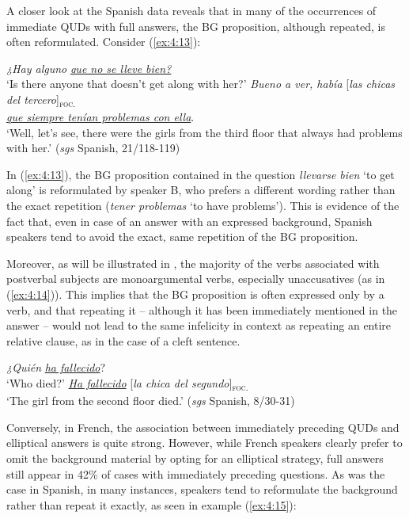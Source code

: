 A closer look at the Spanish data reveals that in many of the occurrences of immediate QUDs with full answers, the BG proposition, although repeated, is often reformulated. Consider (\ref{ex:4:13}):

\ea \label{ex:4:13}
\ea	\textit{¿Hay alguno} \uline{\textit{que no se lleve bien?}}\\
 ‘Is there anyone that doesn't get along with her?'
\ex \textit{Bueno a ver, había} {[\textit{las chicas del tercero}]\textsubscript{\textsc{foc.}}}\\
\normalsize \uline{\textit{que siempre tenían problemas con ella}}.\\
‘Well, let's see, there were the girls from the third floor that always had problems with her.' \hfill (\textit{sgs} Spanish, 21/118-119)   
\z \z

In (\ref{ex:4:13}), the BG proposition contained in the question \textit{llevarse bien} `to get along' is reformulated by speaker B, who prefers a different wording rather than the exact repetition (\textit{tener problemas} `to have problems'). This is evidence of the fact that, even in case of an answer with an expressed background, Spanish speakers tend to avoid the exact, same repetition of the BG proposition.

Moreover, as will be illustrated in , the majority of the verbs associated with postverbal subjects are monoargumental verbs, especially unaccusatives (as in (\ref{ex:4:14})). This implies that the BG proposition is often expressed only by a verb, and that repeating it -- although it has been immediately mentioned in the answer -- would not lead to the same infelicity in context as repeating an entire relative clause, as in the case of a cleft sentence.

\ea \label{ex:4:14}
\ea	\textit{¿Quién} \uline{\textit{ha fallecido}}?\\
 ‘Who died?'
\ex \uline{\textit{Ha fallecido}} {[\textit{la chica del segundo}]\textsubscript{\textsc{foc.}}}\normalsize\\
‘The girl from the second floor died.' \hfill (\textit{sgs} Spanish, 8/30-31)  
\z \z

Conversely, in French, the association between immediately preceding QUDs and elliptical answers is quite strong. However, while French speakers clearly prefer to omit the background material by opting for an elliptical strategy, full answers still appear in 42\% of cases with immediately preceding questions. As was the case in Spanish, in many instances, speakers tend to reformulate the background rather than repeat it exactly, as seen in example (\ref{ex:4:15}):

